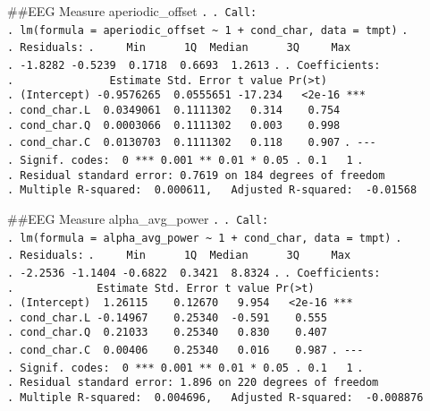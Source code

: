 \documentclass[
]{article}
\begin{document}
\#\#EEG Measure aperiodic\_offset \texttt{.} \texttt{.\ Call:}
\texttt{.\ lm(formula\ =\ aperiodic\_offset\ \textasciitilde{}\ 1\ +\ cond\_char,\ data\ =\ tmpt)}
\texttt{.} \texttt{.\ Residuals:}
\texttt{.\ \ \ \ \ Min\ \ \ \ \ \ 1Q\ \ Median\ \ \ \ \ \ 3Q\ \ \ \ \ Max}
\texttt{.\ -1.8282\ -0.5239\ \ 0.1718\ \ 0.6693\ \ 1.2613} \texttt{.}
\texttt{.\ Coefficients:}
\texttt{.\ \ \ \ \ \ \ \ \ \ \ \ \ \ \ Estimate\ Std.\ Error\ t\ value\ Pr(\textgreater{}\textbar{}t\textbar{})}
\texttt{.\ (Intercept)\ -0.9576265\ \ 0.0555651\ -17.234\ \ \ \textless{}2e-16\ ***}
\texttt{.\ cond\_char.L\ \ 0.0349061\ \ 0.1111302\ \ \ 0.314\ \ \ \ 0.754}
\texttt{.\ cond\_char.Q\ \ 0.0003066\ \ 0.1111302\ \ \ 0.003\ \ \ \ 0.998}
\texttt{.\ cond\_char.C\ \ 0.0130703\ \ 0.1111302\ \ \ 0.118\ \ \ \ 0.907}
\texttt{.\ -\/-\/-}
\texttt{.\ Signif.\ codes:\ \ 0\ \textquotesingle{}***\textquotesingle{}\ 0.001\ \textquotesingle{}**\textquotesingle{}\ 0.01\ \textquotesingle{}*\textquotesingle{}\ 0.05\ \textquotesingle{}.\textquotesingle{}\ 0.1\ \textquotesingle{}\ \textquotesingle{}\ 1}
\texttt{.}
\texttt{.\ Residual\ standard\ error:\ 0.7619\ on\ 184\ degrees\ of\ freedom}
\texttt{.\ Multiple\ R-squared:\ \ 0.000611,\ \ \ Adjusted\ R-squared:\ \ -0.01568}

\#\#EEG Measure alpha\_avg\_power \texttt{.} \texttt{.\ Call:}
\texttt{.\ lm(formula\ =\ alpha\_avg\_power\ \textasciitilde{}\ 1\ +\ cond\_char,\ data\ =\ tmpt)}
\texttt{.} \texttt{.\ Residuals:}
\texttt{.\ \ \ \ \ Min\ \ \ \ \ \ 1Q\ \ Median\ \ \ \ \ \ 3Q\ \ \ \ \ Max}
\texttt{.\ -2.2536\ -1.1404\ -0.6822\ \ 0.3421\ \ 8.8324} \texttt{.}
\texttt{.\ Coefficients:}
\texttt{.\ \ \ \ \ \ \ \ \ \ \ \ \ Estimate\ Std.\ Error\ t\ value\ Pr(\textgreater{}\textbar{}t\textbar{})}
\texttt{.\ (Intercept)\ \ 1.26115\ \ \ \ 0.12670\ \ \ 9.954\ \ \ \textless{}2e-16\ ***}
\texttt{.\ cond\_char.L\ -0.14967\ \ \ \ 0.25340\ \ -0.591\ \ \ \ 0.555}
\texttt{.\ cond\_char.Q\ \ 0.21033\ \ \ \ 0.25340\ \ \ 0.830\ \ \ \ 0.407}
\texttt{.\ cond\_char.C\ \ 0.00406\ \ \ \ 0.25340\ \ \ 0.016\ \ \ \ 0.987}
\texttt{.\ -\/-\/-}
\texttt{.\ Signif.\ codes:\ \ 0\ \textquotesingle{}***\textquotesingle{}\ 0.001\ \textquotesingle{}**\textquotesingle{}\ 0.01\ \textquotesingle{}*\textquotesingle{}\ 0.05\ \textquotesingle{}.\textquotesingle{}\ 0.1\ \textquotesingle{}\ \textquotesingle{}\ 1}
\texttt{.}
\texttt{.\ Residual\ standard\ error:\ 1.896\ on\ 220\ degrees\ of\ freedom}
\texttt{.\ Multiple\ R-squared:\ \ 0.004696,\ \ \ Adjusted\ R-squared:\ \ -0.008876}
\end{document}
